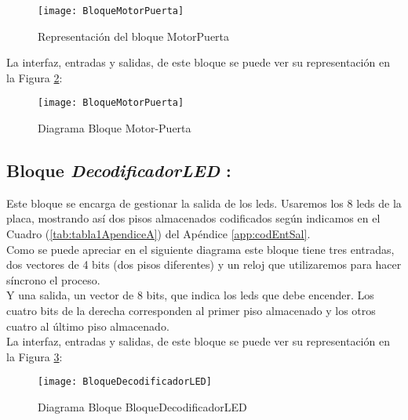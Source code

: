 	\begin{figure}[H]
		    \centering
		    \texttt{[image: BloqueMotorPuerta]}
		    \caption{Representación del bloque MotorPuerta}
		    \label{fig:MotorPuerta}
	\end{figure}

	La interfaz, entradas y salidas, de este bloque se puede ver su representación en la Figura \ref{fig:BloqueMotorPuerta}:
    
    \begin{figure}[H]
		    \centering
		    \texttt{[image: BloqueMotorPuerta]}
		    \caption{Diagrama Bloque Motor-Puerta}
		    \label{fig:BloqueMotorPuerta}
	\end{figure}

\subsection {Bloque \textit{DecodificadorLED} :} \label{bloque:DecodificadorLED}
    Este bloque se encarga de gestionar la salida de los leds. Usaremos los 8 leds de la placa, mostrando así dos pisos almacenados codificados según indicamos en el Cuadro (\ref{tab:tabla1ApendiceA}) del Apéndice \ref{app:codEntSal}. \\
    
	Como se puede apreciar en el siguiente diagrama este bloque tiene tres entradas, dos vectores de 4 bits (dos pisos diferentes) y un reloj que utilizaremos para hacer síncrono el proceso. \\ 
	
	Y una salida, un vector de 8 bits, que indica los leds que debe encender. Los cuatro bits de la derecha corresponden al primer piso almacenado y los otros cuatro al último piso almacenado. \\ 
    
	La interfaz, entradas y salidas, de este bloque se puede ver su representación en la Figura \ref{fig:BloqueDecodificadorLED}:
    
    \begin{figure}[H]
		    \centering
		    \texttt{[image: BloqueDecodificadorLED]}
		    \caption{Diagrama Bloque BloqueDecodificadorLED}
		    \label{fig:BloqueDecodificadorLED}
	\end{figure}
